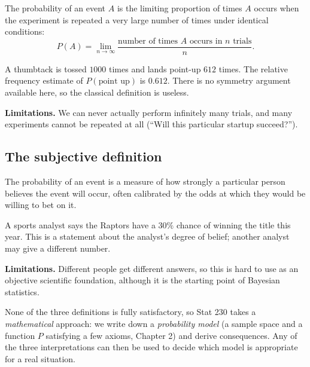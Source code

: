\begin{definition}
The probability of an event $A$ is the limiting proportion of times $A$ occurs when the
experiment is repeated a very large number of times under identical conditions:
\[
  P(A) = \lim_{n\to\infty} \frac{\text{number of times $A$ occurs in $n$ trials}}{n}.
\]
\end{definition}

\begin{example}
A thumbtack is tossed $1000$ times and lands point-up $612$ times. The relative frequency
estimate of $P(\text{point up})$ is $0.612$. There is no symmetry argument available
here, so the classical definition is useless.
\end{example}

\textbf{Limitations.} We can never actually perform infinitely many trials, and many
experiments cannot be repeated at all (``Will this particular startup succeed?'').

\subsection{The subjective definition}

\begin{definition}
The probability of an event is a measure of how strongly a particular person believes the
event will occur, often calibrated by the odds at which they would be willing to bet on
it.
\end{definition}

\begin{example}
A sports analyst says the Raptors have a $30\%$ chance of winning the title this year.
This is a statement about the analyst's degree of belief; another analyst may give a
different number.
\end{example}

\textbf{Limitations.} Different people get different answers, so this is hard to use as an
objective scientific foundation, although it is the starting point of Bayesian
statistics.

\begin{important}
None of the three definitions is fully satisfactory, so Stat 230 takes a
\emph{mathematical} approach: we write down a \emph{probability model} (a sample space and
a function $P$ satisfying a few axioms, Chapter 2) and derive consequences. Any of the
three interpretations can then be used to decide which model is appropriate for a real
situation.
\end{important}

